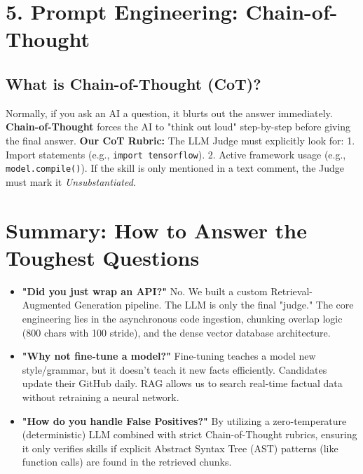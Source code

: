 \documentclass[12pt,a4paper]{article}
\begin{document}
\section{5. Prompt Engineering: Chain-of-Thought}
\subsection{What is Chain-of-Thought (CoT)?}
Normally, if you ask an AI a question, it blurts out the answer immediately. \textbf{Chain-of-Thought} forces the AI to "think out loud" step-by-step before giving the final answer. 
\newline\newline
\textbf{Our CoT Rubric:} The LLM Judge must explicitly look for:
1. Import statements (e.g., \texttt{import tensorflow}).
2. Active framework usage (e.g., \texttt{model.compile()}).
If the skill is only mentioned in a text comment, the Judge must mark it \textit{Unsubstantiated}.

\section{Summary: How to Answer the Toughest Questions}
\begin{itemize}
    \item \textbf{"Did you just wrap an API?"} \newline No. We built a custom Retrieval-Augmented Generation pipeline. The LLM is only the final "judge." The core engineering lies in the asynchronous code ingestion, chunking overlap logic (800 chars with 100 stride), and the dense vector database architecture.
    \item \textbf{"Why not fine-tune a model?"} \newline Fine-tuning teaches a model new style/grammar, but it doesn't teach it new facts efficiently. Candidates update their GitHub daily. RAG allows us to search real-time factual data without retraining a neural network.
    \item \textbf{"How do you handle False Positives?"} \newline By utilizing a zero-temperature (deterministic) LLM combined with strict Chain-of-Thought rubrics, ensuring it only verifies skills if explicit Abstract Syntax Tree (AST) patterns (like function calls) are found in the retrieved chunks.
\end{itemize}
\end{document}
